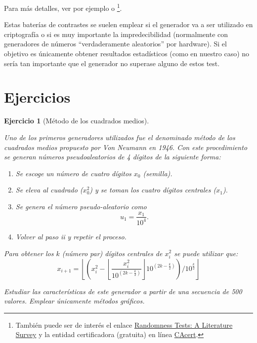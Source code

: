 \documentclass[
  spanish,
  10pt,
]{book}
\theoremstyle{break}
\newtheorem{exercise}{Ejercicio}[chapter]
\theoremstyle{nonumberplain}
\let\oldfootnote\footnote
\renewcommand\footnote[1]{\oldfootnote{\hspace{2mm}#1}}
\begin{document}
Para más detalles, ver por ejemplo \citet{marsaglia2002} o \citet{demirhan2016}\footnote{También puede ser de interés el enlace \href{http://www.ciphersbyritter.com/RES/RANDTEST.HTM}{Randomness Tests: A Literature Survey} y la entidad certificadora (gratuita) en línea \href{http://www.cacert.at/random}{CAcert}.}.

Estas baterías de contrastes se suelen emplear si el generador va a ser utilizado en criptografía o si es muy importante la impredecibilidad (normalmente con generadores de números ``verdaderamente aleatorios'' por hardware).
Si el objetivo es únicamente obtener resultados estadísticos (como en nuestro caso) no sería tan importante que el generador no superase alguno de estos test.

\section{Ejercicios}\label{ejercicios-1}

\begin{exercise}[Método de los cuadrados medios]
\protect\hypertarget{exr:RANDVN}{}\label{exr:RANDVN}

Uno de los primeros generadores utilizados fue el denominado método de los cuadrados medios propuesto por Von Neumann en 1946.
Con este procedimiento se generan números pseudoaleatorios de 4 dígitos de la siguiente forma:

\begin{enumerate}
\def\labelenumi{\roman{enumi}.}
\item
  Se escoge un número de cuatro dígitos \(x_0\) (semilla).
\item
  Se eleva al cuadrado (\(x_0^2\)) y se toman los cuatro dígitos centrales (\(x_1\)).
\item
  Se genera el número pseudo-aleatorio como \[u_1=\frac{x_1}{10^{4}}.\]
\item
  Volver al paso ii y repetir el proceso.
\end{enumerate}

Para obtener los \(k\) (número par) dígitos centrales de \(x_{i}^2\)
se puede utilizar que:
\[x_{i+1}=\left\lfloor \left(  x_{i}^2-\left\lfloor \dfrac{x_{i}^2}{10^{(2k-\frac{k}2)}}\right\rfloor 10^{(2k-\frac{k}2)}\right)
/10^{\frac{k}2}\right\rfloor\]

Estudiar las características de este generador a partir de una secuencia de 500 valores.
Emplear únicamente métodos gráficos.
\end{exercise}
\end{document}
